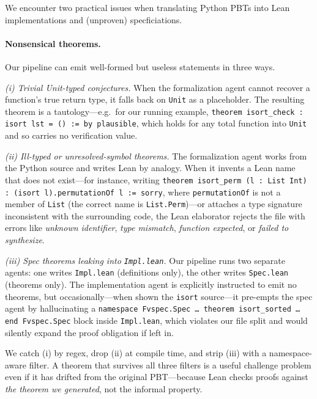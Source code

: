 We encounter two practical issues when translating Python PBTs into Lean implementations and (unproven) specficiations.

\paragraph{Nonsensical theorems.} Our pipeline can emit well-formed but useless statements in three ways.

\emph{(i) Trivial Unit-typed conjectures.} When the formalization agent cannot recover a function's true return type, it falls back on \texttt{Unit} as a placeholder. The resulting theorem is a tautology---e.g.\ for our running example, \texttt{theorem isort\_check : isort lst = () := by plausible}, which holds for any total function into \texttt{Unit} and so carries no verification value.

\emph{(ii) Ill-typed or unresolved-symbol theorems.} The formalization agent works from the Python source and writes Lean by analogy. When it invents a Lean name that does not exist---for instance, writing \texttt{theorem isort\_perm (l : List Int) : (isort l).permutationOf l := sorry}, where \texttt{permutationOf} is not a member of \texttt{List} (the correct name is \texttt{List.Perm})---or attaches a type signature inconsistent with the surrounding code, the Lean elaborator rejects the file with errors like \emph{unknown identifier}, \emph{type mismatch}, \emph{function expected}, or \emph{failed to synthesize}.

\emph{(iii) Spec theorems leaking into \texttt{Impl.lean}.} Our pipeline runs two separate agents: one writes \texttt{Impl.lean} (definitions only), the other writes \texttt{Spec.lean} (theorems only). The implementation agent is explicitly instructed to emit no theorems, but occasionally---when shown the \texttt{isort} source---it pre-empts the spec agent by hallucinating a \texttt{namespace Fvspec.Spec\,\dots\,theorem isort\_sorted\,\dots\,end Fvspec.Spec} block inside \texttt{Impl.lean}, which violates our file split and would silently expand the proof obligation if left in.

We catch (i) by regex, drop (ii) at compile time, and strip (iii) with a namespace-aware filter. A theorem that survives all three filters is a useful challenge problem even if it has drifted from the original PBT---because Lean checks proofs against \emph{the theorem we generated}, not the informal property.

